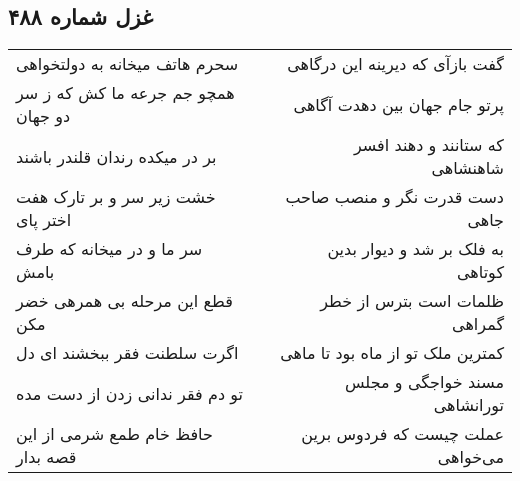 \begin{center}
\section*{غزل شماره ۴۸۸}
\label{sec:sh488}
\begin{longtable}{l p{0.5cm} r}
سحرم هاتف میخانه به دولتخواهی
&&
گفت بازآی که دیرینه این درگاهی
\\
همچو جم جرعه ما کش که ز سر دو جهان
&&
پرتو جام جهان بین دهدت آگاهی
\\
بر در میکده رندان قلندر باشند
&&
که ستانند و دهند افسر شاهنشاهی
\\
خشت زیر سر و بر تارک هفت اختر پای
&&
دست قدرت نگر و منصب صاحب جاهی
\\
سر ما و در میخانه که طرف بامش
&&
به فلک بر شد و دیوار بدین کوتاهی
\\
قطع این مرحله بی همرهی خضر مکن
&&
ظلمات است بترس از خطر گمراهی
\\
اگرت سلطنت فقر ببخشند ای دل
&&
کمترین ملک تو از ماه بود تا ماهی
\\
تو دم فقر ندانی زدن از دست مده
&&
مسند خواجگی و مجلس تورانشاهی
\\
حافظ خام طمع شرمی از این قصه بدار
&&
عملت چیست که فردوس برین می‌خواهی
\\
\end{longtable}
\end{center}
